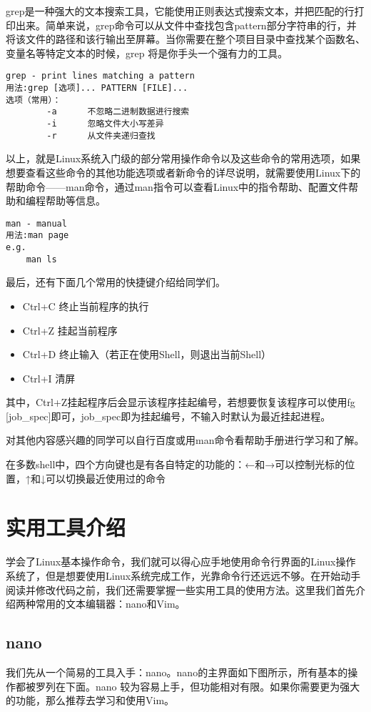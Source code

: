 grep是一种强大的文本搜索工具，它能使用正则表达式搜索文本，并把匹配的行打印出来。简单来说，grep命令可以从文件中查找包含pattern部分字符串的行，并将该文件的路径和该行输出至屏幕。当你需要在整个项目目录中查找某个函数名、变量名等特定文本的时候，grep 将是你手头一个强有力的工具。

\begin{verbatim}
grep - print lines matching a pattern
用法:grep [选项]... PATTERN [FILE]...
选项（常用）：
		-a		不忽略二进制数据进行搜索
		-i		忽略文件大小写差异
		-r		从文件夹递归查找
\end{verbatim}

以上，就是Linux系统入门级的部分常用操作命令以及这些命令的常用选项，如果想要查看这些命令的其他功能选项或者新命令的详尽说明，就需要使用Linux下的帮助命令——man命令，通过man指令可以查看Linux中的指令帮助、配置文件帮助和编程帮助等信息。

\begin{verbatim}
man - manual
用法:man page
e.g.
	man ls
\end{verbatim}

最后，还有下面几个常用的快捷键介绍给同学们。
\begin{itemize}
    \item Ctrl+C	终止当前程序的执行
	\item Ctrl+Z	挂起当前程序
	\item Ctrl+D	终止输入（若正在使用Shell，则退出当前Shell）
	\item Ctrl+I	清屏
\end{itemize}

其中，Ctrl+Z挂起程序后会显示该程序挂起编号，若想要恢复该程序可以使用fg [job\_spec]即可，job\_spec即为挂起编号，不输入时默认为最近挂起进程。

对其他内容感兴趣的同学可以自行百度或用man命令看帮助手册进行学习和了解。

\begin{note}
在多数shell中，四个方向键也是有各自特定的功能的：←和→可以控制光标的位置，↑和↓可以切换最近使用过的命令
\end{note}

\section{实用工具介绍}
学会了Linux基本操作命令，我们就可以得心应手地使用命令行界面的Linux操作系统了，但是想要使用Linux系统完成工作，光靠命令行还远远不够。在开始动手阅读并修改代码之前，我们还需要掌握一些实用工具的使用方法。这里我们首先介绍两种常用的文本编辑器：nano和Vim。
\subsection{nano}
我们先从一个简易的工具入手：nano。nano的主界面如下图所示，所有基本的操作都被罗列在下面。nano 较为容易上手，但功能相对有限。如果你需要更为强大的功能，那么推荐去学习和使用Vim。

